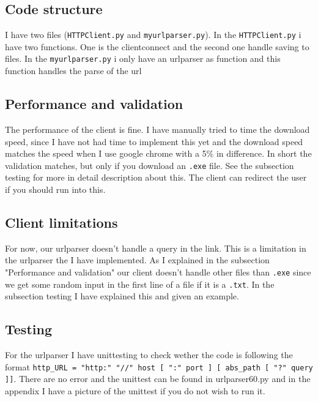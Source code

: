 \documentclass{sig-alternate-05-2015}
\begin{document}
\subsection{Code structure}
I have two files (\texttt{HTTPClient.py} and \texttt{myurlparser.py}). In the \texttt{HTTPClient.py} i have two functions. One is the clientconnect and the second one handle saving to files. In the \texttt{myurlparser.py} i only have an urlparser as function and this function handles the parse of the url

\subsection{Performance and validation}
The performance of the client is fine. I have manually tried to time the download speed, since I have not had time to implement this yet and the download speed matches the speed when I use google chrome with a 5\% in difference.
In short the validation matches, but only if you download an \texttt{.exe} file. See the subsection testing for more in detail description about this.
The client can redirect the user if you should run into this.


\subsection{Client limitations}
For now, our urlparser doesn't handle a query in the link. This is a limitation in the urlparser the I have implemented.
As I explained in the subsection "Performance and validation" our client doesn't handle other files than \texttt{.exe} since we get some random input in the first line of a file if it is a \texttt{.txt}. In the subsection testing I have explained this and given an example.


\subsection{Testing}
For the urlparser I have unittesting to check wether the code is following the format \texttt{http\_URL = "http:" "//" host [ ":" port ] [ abs\_path [ "?" query ]]}. There are no error and the unittest can be found in urlparser60.py and in the appendix I have a picture of the unittest if you do not wish to run it.
\end{document}
